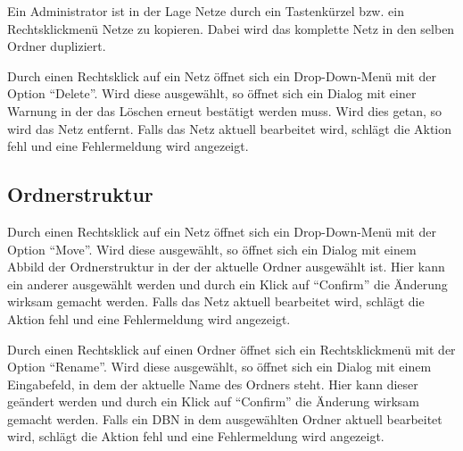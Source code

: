 \documentclass[parskip=full,11pt,twoside]{scrartcl}
\begin{document}


Ein Administrator ist in der Lage Netze durch ein Tastenkürzel bzw. ein Rechtsklickmenü Netze zu kopieren. Dabei wird das komplette Netz in den selben Ordner dupliziert.
\pagebreak
{}

Durch einen Rechtsklick auf ein Netz öffnet sich ein Drop-Down-Menü mit der Option \enquote{Delete}. Wird diese ausgewählt, so öffnet sich ein Dialog mit einer Warnung in der das Löschen erneut bestätigt werden muss. Wird dies getan, so wird das Netz entfernt.
Falls das Netz aktuell bearbeitet wird, schlägt die Aktion fehl und eine Fehlermeldung wird angezeigt.

\subsection{Ordnerstruktur}


Durch einen Rechtsklick auf ein Netz öffnet sich ein Drop-Down-Menü mit der Option \enquote{Move}.
Wird diese ausgewählt, so öffnet sich ein Dialog mit einem Abbild der Ordnerstruktur in der der aktuelle Ordner ausgewählt ist. Hier kann ein anderer ausgewählt werden und durch ein Klick auf \enquote{Confirm} die Änderung wirksam gemacht werden.
Falls das Netz aktuell bearbeitet wird, schlägt die Aktion fehl und eine Fehlermeldung wird angezeigt.


Durch einen Rechtsklick auf einen Ordner öffnet sich ein Rechtsklickmenü mit der Option \enquote{Rename}. Wird diese ausgewählt, so öffnet sich ein Dialog mit einem Eingabefeld, in dem der aktuelle Name des Ordners steht. Hier kann dieser geändert werden und durch ein Klick auf \enquote{Confirm} die Änderung wirksam gemacht werden.
Falls ein DBN in dem ausgewählten Ordner aktuell bearbeitet wird, schlägt die Aktion fehl und eine Fehlermeldung wird angezeigt.
\end{document}
